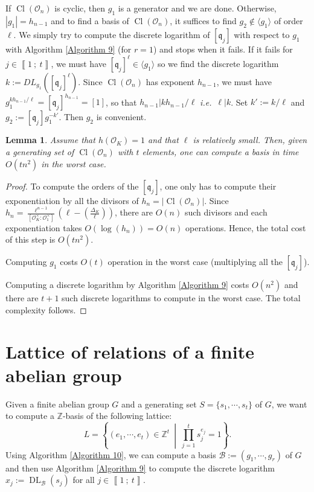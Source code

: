 \documentclass[a4paper,10pt,notitlepage]{report}
\theoremstyle{definition}
\theoremstyle{plain}
\newtheorem{Lemma}[Definition]{Lemma}
\theoremstyle{definition}
\newcommand{\ie}{\emph{i.e.}\ }
\newcommand{\Z}{\mathbb{Z}}
\newcommand{\m}[1]{\mathcal{#1}}
\newcommand{\mO}{\mathcal{O}}
\renewcommand{\i}[2]{\left\llbracket #1~;~#2\right\rrbracket}
\renewcommand{\(}{\left(}
\renewcommand{\)}{\right)}
\newcommand{\mf}[1]{\mathfrak{#1}}
\DeclareMathOperator{\Cl}{Cl}
\DeclareMathOperator{\DL}{DL}
\begin{document}
If $\Cl(\mO_n)$ is cyclic, then $g_1$ is a generator and we are done. Otherwise, $|g_1|=h_{n-1}$ and to find a basis of $\Cl(\mO_n)$, it suffices to find $g_2\not\in \langle g_1\rangle$ of order $\ell$. We simply try to compute the discrete logarithm of $[\mf{q}_j]$ with respect to $g_1$ with Algorithm \ref{Algorithm 9} (for $r=1$) and stops when it fails. If it fails for $j\in\i{1}{t}$, we must have $[\mf{q}_j]^\ell\in\langle g_1\rangle$ so we find the discrete logarithm $k:=DL_{g_1}([\mf{q}_j]^\ell)$. Since $\Cl(\mO_n)$ has exponent $h_{n-1}$, we must have $g_1^{kh_{n-1}/\ell}=[\mf{q}_j]^{h_{n-1}}=[1]$, so that $h_{n-1}|kh_{n-1}/\ell$ \ie $\ell|k$. Set $k':=k/\ell$ and $g_2:=[\mf{q}_j]g_1^{-k'}$. Then $g_2$ is convenient.

\begin{Lemma}\label{Lemma 19}
Assume that $h(\mO_K)=1$ and that $\ell$ is relatively small. Then, given a generating set of $\Cl(\mO_n)$ with $t$ elements, one can compute a basis in time $O(tn^2)$ in the worst case. 
\end{Lemma}

\begin{proof}
To compute the orders of the $[\mf{q}_j]$, one only has to compute their exponentiation by all the divisors of $h_n=|\Cl(\mO_n)|$. Since $h_n=\frac{\ell^{n-1}}{[\mO_K^\times:\mO_1^\times]}\(\ell-\(\frac{\Delta_K}{\ell}\)\)$, there are $O(n)$ such divisors and each exponentiation takes $O(\log(h_n))=O(n)$ operations. Hence, the total cost of this step is $O(tn^2)$.

Computing $g_1$ costs $O(t)$ operation in the worst case (multiplying all the $[\mf{q}_j]$).

Computing a discrete logarithm by Algorithm \ref{Algorithm 9} costs $O(n^2)$ and there are $t+1$ such discrete logarithms to compute in the worst case. The total complexity follows.
\end{proof}

\section{Lattice of relations of a finite abelian group}

Given a finite abelian group $G$ and a generating set $S=\{s_1,\cdots, s_t\}$ of $G$, we want to compute a $\Z$-basis of the following lattice:
\[L=\left\{(e_1,\cdots,e_t)\in\Z^t \ \middle| \ \prod_{j=1}^t s_j^{e_j}=1\right\}.\]
Using Algorithm \ref{Algorithm 10}, we can compute a basis $\m{B}:=(g_1,\cdots, g_r)$ of $G$ and then use Algorithm \ref{Algorithm 9} to compute the discrete logarithm $x_j:=\DL_{\m{B}}(s_j)$ for all $j\in\i{1}{t}$. 
\end{document}
